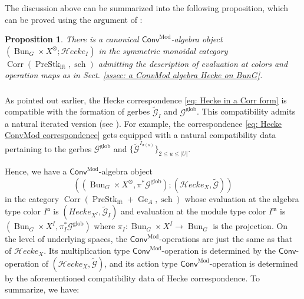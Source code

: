 \documentclass[10pt]{amsart}
\newcommand{\sssec}{\subsubsection}
\newtheorem{prop}[subsubsection]{Proposition}
\theoremstyle{remark}
\newcommand{\mf}[1]{\mathfrak{#1}}
\newcommand{\wt}{\widetilde}
\newcommand{\on}{\operatorname}
\newcommand{\cG}{\mathcal{G}}
\newcommand{\PreStklft}{\on{PreStk}_{\on{lft}}}
\newcommand{\Bun}{\on{Bun}}
\newcommand{\Conv}{\mathsf{Conv}}
\newcommand{\ConvMod}{\mathsf{Conv}^{\on{Mod}}}
\newcommand{\cHecke}{\mathcal{H}ecke}
\newcommand{\Corr}{\on{Corr}}
\begin{document}
    The discussion above can be summarized into the following proposition, which can be proved using the argument of \cite[Sect. 1.2.7]{ZhaoNew}:

\begin{prop}
    There is a canonical $\ConvMod$-algebra object $(\Bun_G\times X^{\otimes}; \cHecke_I)$ in the symmetric monoidal category $\Corr(\PreStklft, \on{sch})$ admitting the description of evaluation at colors and operation maps as in Sect. \ref{sssec: a ConvMod algebra Hecke on BunG}.
\end{prop}

\sssec{}
As pointed out earlier, the Hecke correspondence \eqref{eq: Hecke in a Corr form} is compatible with the formation of gerbes $\wt{\cG}_I$ and $\cG^{\on{glob}}$. This compatibility admits a natural iterated version (see \cite[Lemma 7.1.11]{ZhaoNew}). For example, the correspondence \eqref{eq: Hecke ConvMod correspondence} gets equipped with a natural compatibility data pertaining to the gerbes $\cG^{\on{glob}}$ and $\{\wt{\cG}^{I_{\sigma(u)}}\}_{2\le u\le |U|}$.
\medskip

Hence, we have a $\ConvMod$-algebra object 
\begin{equation}\label{eq: ConvMod BunG Hecke gerbe}
    ((\Bun_G\times X^{\otimes},\pi^*\cG^{\on{glob}}); (\cHecke_{X},\wt{\cG}))
\end{equation}
in the category $\Corr(\PreStklft+\on{Ge}_A,\on{sch})$ whose evaluation at the algebra type color $I^{\mf{a}}$ is $(Hecke_{X^I},\wt{\cG}_I)$ and evaluation at the module type color $I^{\mf{m}}$ is $(\Bun_G\times X^I, \pi_I^*\cG^{\on{glob}})$ where $\pi_I: \Bun_G\times X^I\rightarrow \Bun_G$ is the projection. On the level of underlying spaces, the $\ConvMod$-operations are just the same as that of $\cHecke_X$. Its multiplication type $\ConvMod$-operation is determined by the $\Conv$-operation of $(\cHecke_{X},\wt{\cG})$, and its action type $\ConvMod$-operation is determined by the aforementioned compatibility data of Hecke correspondence. To summarize, we have:
\end{document}
